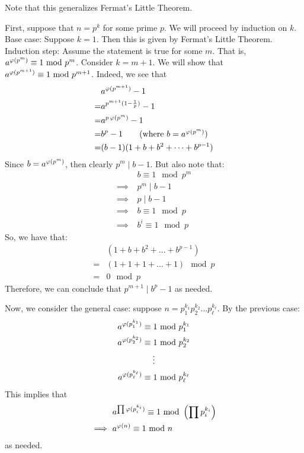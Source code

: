 \documentclass{article}
\begin{document}
Note that this generalizes Fermat's Little Theorem.

\begin{pf}[source=Primary Source Material]
    First, suppose that $ n = p^{k} $ for some prime $ p $.
    We will proceed by induction on $ k $. \vsp
    Base case: Suppose $ k = 1 $. Then this is given by Fermat's Little Theorem. \vsp
    Induction step: Assume the statement is true for some $ m $.
    That is, $ a^{\operatorname{\varphi}(p^{m})} \equiv 1 \ \mathrm{mod}\ p^{m} $.
    Consider $ k = m + 1 $. We will show that $ a^{\operatorname{\varphi}(p^{m + 1})} \equiv 1 \ \mathrm{mod}\ p^{m+1} $. \vsp
    Indeed, we see that
    \begin{align*}
        & a^{\vphi(p^{m+1})} - 1 \\
        = & a^{p^{m+1}(1 - \frac{1}{p})} - 1 \\
        = & a^{p\vphi(p^{m})} - 1 \\
        = & b^{p} - 1 \tag {where $ b = a^{\vphi(p^{m})} $} \\
        = & (b - 1)(1 + b + b^{2} + \dots + b^{p - 1})
    \end{align*}
    Since $ b = a^{\operatorname{\varphi}(p^{m})} $, then clearly $ p^{m} \mid b - 1 $.
    But also note that:
    \begin{align*}
        & b \equiv 1 \mod p^{m} \\
        \implies \ & p^{m} \mid b - 1 \\
        \implies \ & p \mid b - 1 \\
        \implies \ & b \equiv 1 \mod p \\
        \implies \ & b^{i} \equiv 1 \mod p
    \end{align*}
    So, we have that:
    \begin{align*}
        & (1 + b + b^{2} + \dots + b^{p-1}) \\
        = & (1 + 1 + 1 + \dots + 1) \mod p \\
        = & 0 \mod p
    \end{align*}
    Therefore, we can conclude that $ p^{m+1} \mid b^{p} - 1 $ as needed. \npgh

    Now, we consider the general case: suppose $ n = p_{1}^{k_{1}}p_{2}^{k_{2}}\dots p_{\ell}^{k_{\ell}} $.
    By the previous case:
    \begin{gather*}
        a^{\operatorname{\varphi}(p_{1}^{k_{1}})} \equiv 1 \ \mathrm{mod}\ p_{1}^{k_{1}} \\
        a^{\operatorname{\varphi}(p_{2}^{k_{2}})} \equiv 1 \ \mathrm{mod}\ p_{2}^{k_{2}} \\
        \vdots \\
        a^{\operatorname{\varphi}(p_{\ell}^{k_{\ell}})} \equiv 1 \ \mathrm{mod}\ p_{\ell}^{k_{\ell}}
    \end{gather*}
    This implies that
    \begin{align*}
        & a^{\prod \operatorname{\varphi}(p_{i}^{k_{i}})} \equiv 1 \ \mathrm{mod}\ \left( \prod p_{i}^{k_{i}} \right) \\
        \implies \ & a^{\operatorname{\varphi}(n)} \equiv 1 \ \mathrm{mod}\ n
    \end{align*}
    as needed.
\end{pf}
\end{document}
